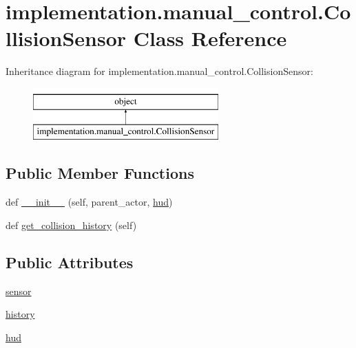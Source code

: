 \hypertarget{classimplementation_1_1manual__control_1_1_collision_sensor}{}\section{implementation.\+manual\+\_\+control.\+Collision\+Sensor Class Reference}
\label{classimplementation_1_1manual__control_1_1_collision_sensor}
Inheritance diagram for implementation.\+manual\+\_\+control.\+Collision\+Sensor\+:\begin{figure}[H]
\begin{center}
\leavevmode
\includegraphics[height=2.000000cm]{classimplementation_1_1manual__control_1_1_collision_sensor}
\end{center}
\end{figure}
\subsection*{Public Member Functions}
\begin{DoxyCompactItemize}
\item 
def \hyperlink{classimplementation_1_1manual__control_1_1_collision_sensor_aa60cd8ac42d412ca5d780332e1785916}{\+\_\+\+\_\+init\+\_\+\+\_\+} (self, parent\+\_\+actor, \hyperlink{classimplementation_1_1manual__control_1_1_collision_sensor_a207937a78ede8085241d480d419f157f}{hud})
\item 
def \hyperlink{classimplementation_1_1manual__control_1_1_collision_sensor_ad71f3095c743ed6a44e4424ae865276f}{get\+\_\+collision\+\_\+history} (self)
\end{DoxyCompactItemize}
\subsection*{Public Attributes}
\begin{DoxyCompactItemize}
\item 
\hyperlink{classimplementation_1_1manual__control_1_1_collision_sensor_a3c7f37286c361206b0b5c6d89878cd90}{sensor}
\item 
\hyperlink{classimplementation_1_1manual__control_1_1_collision_sensor_a5ba30843b06e1f424b620067aea9dafe}{history}
\item 
\hyperlink{classimplementation_1_1manual__control_1_1_collision_sensor_a207937a78ede8085241d480d419f157f}{hud}
\end{DoxyCompactItemize}


